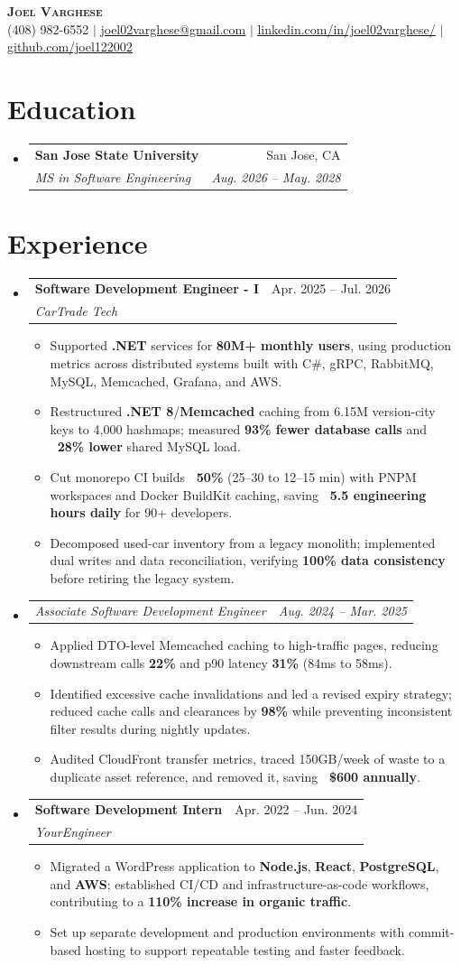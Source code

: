 \documentclass[letterpaper,11pt]{article}
\makeatletter
\newcommand{\resumeItem}[1]{
  \item\small{
    {#1 \vspace{-2pt}}
  }
}
\newcommand{\resumeSubheading}[4]{
  \vspace{-2pt}\item
    \begin{tabular*}{0.97\textwidth}[t]{l@{\extracolsep{\fill}}r}
      \textbf{#1} & #2 \\
      \textit{\small#3} & \textit{\small #4} \\
    \end{tabular*}\vspace{-7pt}
}
\newcommand{\resumeSubSubheading}[2]{
    \item
    \begin{tabular*}{0.97\textwidth}{l@{\extracolsep{\fill}}r}
      \textit{\small#1} & \textit{\small #2} \\
    \end{tabular*}\vspace{-7pt}
}
\newcommand{\resumeSubHeadingListStart}{\begin{itemize}[leftmargin=0.15in, label={}]}
\newcommand{\resumeSubHeadingListEnd}{\end{itemize}}
\newcommand{\resumeItemListStart}{\begin{itemize}}
\newcommand{\resumeItemListEnd}{\end{itemize}\vspace{-5pt}}
\makeatother
\begin{document}
\begin{center}
  \textbf{\Huge \scshape Joel Varghese} \\ \vspace{1pt}
  \small (408) 982-6552 $|$ \href{mailto:joel02varghese@gmail.com}{\underline{joel02varghese@gmail.com}} $|$
  \href{https://www.linkedin.com/in/joel02varghese/}{\underline{linkedin.com/in/joel02varghese/}} $|$
  \href{https://github.com/joel122002}{\underline{github.com/joel122002}}
\end{center}

\section{Education}
\resumeSubHeadingListStart
\resumeSubheading
{San Jose State University}{San Jose, CA}
{MS in Software Engineering}{Aug. 2026 -- May. 2028}
\resumeSubHeadingListEnd

\section{Experience}
\resumeSubHeadingListStart
\resumeSubheading
{Software Development Engineer - I}{Apr. 2025 -- Jul. 2026}
{CarTrade Tech}{}
\resumeItemListStart
\resumeItem{Supported \textbf{.NET} services for \textbf{80M+ monthly users}, using production metrics across distributed systems built with C\#, gRPC, RabbitMQ, MySQL, Memcached, Grafana, and AWS.}
\resumeItem{Restructured \textbf{.NET 8}/\textbf{Memcached} caching from 6.15M version-city keys to 4,000 hashmaps; measured \textbf{93\% fewer database calls} and \textbf{~28\% lower} shared MySQL load.}
\resumeItem{Cut monorepo CI builds \textbf{~50\%} (25--30 to 12--15 min) with PNPM workspaces and Docker BuildKit caching, saving \textbf{~5.5 engineering hours daily} for 90+ developers.}
\resumeItem{Decomposed used-car inventory from a legacy monolith; implemented dual writes and data reconciliation, verifying \textbf{100\% data consistency} before retiring the legacy system.}
\resumeItemListEnd
\resumeSubSubheading
{Associate Software Development Engineer}{Aug. 2024 -- Mar. 2025}
\resumeItemListStart
\resumeItem{Applied DTO-level Memcached caching to high-traffic pages, reducing downstream calls \textbf{22\%} and p90 latency \textbf{31\%} (84ms to 58ms).}
\resumeItem{Identified excessive cache invalidations and led a revised expiry strategy; reduced cache calls and clearances by \textbf{98\%} while preventing inconsistent filter results during nightly updates.}
\resumeItem{Audited CloudFront transfer metrics, traced 150GB/week of waste to a duplicate asset reference, and removed it, saving \textbf{~\$600 annually}.}
\resumeItemListEnd
\resumeSubheading
{Software Development Intern}{Apr. 2022 -- Jun. 2024}
{YourEngineer}{}
\resumeItemListStart
\resumeItem{Migrated a WordPress application to \textbf{Node.js}, \textbf{React}, \textbf{PostgreSQL}, and \textbf{AWS}; established CI/CD and infrastructure-as-code workflows, contributing to a \textbf{110\% increase in organic traffic}.}
\resumeItem{Set up separate development and production environments with commit-based hosting to support repeatable testing and faster feedback.}
\resumeItemListEnd
\resumeSubHeadingListEnd
\end{document}
